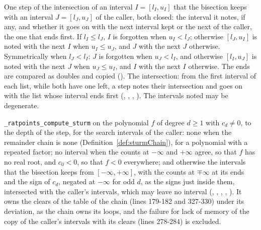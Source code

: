 \begin{definition}\label{def:intersect}
  \leanok
  One step of the intersection of an interval $I = [l_I, u_I]$ that the bisection keeps with an
  interval $J = [l_J, u_J]$ of the caller, both closed: the interval it notes, if any, and whether
  it goes on with the next interval kept or the next of the caller, the one that ends first. If
  $l_I \le l_J$, $I$ is forgotten when $u_I < l_J$; otherwise $[l_J, u_I]$ is noted with the next
  $I$ when $u_I \le u_J$, and $J$ with the next $J$ otherwise. Symmetrically when $l_J < l_I$: $J$
  is forgotten when $u_J < l_I$, and otherwise $[l_I, u_J]$ is noted with the next $J$ when
  $u_J \le u_I$, and $I$ with the next $I$ otherwise. The ends are compared as doubles and copied
  (). The intersection: from the first interval of each list, while both
  have one left, a step notes their intersection and goes on with the list whose interval ends first
  (, , ,
  ). The intervals noted may be degenerate.
\end{definition}

\begin{definition}\label{def:computeSturm}
  \leanok
  \verb|_ratpoints_compute_sturm| on the polynomial $f$ of degree $d \ge 1$ with $c_d \ne 0$, to the
  depth of the step, for the search intervals of the caller: none when the remainder chain is none
  (Definition~\ref{def:sturmChain}), for a polynomial with a repeated factor; no interval when the
  counts at $-\infty$ and $+\infty$ agree, so that $f$ has no real root, and $c_0 < 0$, so that
  $f < 0$ everywhere; and otherwise the intervals that the bisection keeps from
  $[-\infty, +\infty]$, with the counts at $\mp\infty$ at its ends and the sign of $c_d$, negated at
  $-\infty$ for odd $d$, as the signs just inside them, intersected with the caller's intervals,
  which may leave no interval (, ,
  , , ). It owns
  the clears of the table of the chain (lines 179-182 and 327-330) under its deviation, as the chain
  owns its loops, and the failure for lack of memory of the copy of the caller's intervals with its
  clears (lines 278-284) is excluded.
\end{definition}

